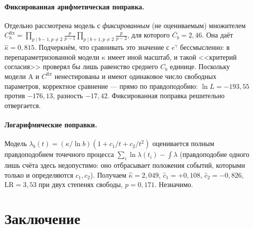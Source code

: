 \documentclass[11pt,a4paper]{article}
\theoremstyle{plain}
\theoremstyle{remark}
\newcommand{\eg}{e^{\gamma}}
\begin{document}
\paragraph{Фиксированная арифметическая поправка.} Отдельно рассмотрена модель с
\emph{фиксированным} (не оцениваемым) множителем
$C^{\mathrm{fix}}_b=\prod_{p\mid b-1,p\ne2}\frac{p}{p-1}\prod_{p\mid b+1,p\ne2}\frac{p}{p-2}$,
для которого $\overline{C_b}=2{,}46$. Она даёт $\hat\kappa=0{,}815$. Подчеркнём, что
сравнивать это значение с $\eg$ бессмысленно: в перепараметризованной модели $\kappa$
имеет иной масштаб, и такой <<критерий согласия>> проверял бы лишь равенство среднего
$C_b$ единице. Поскольку модели A и $C^{\mathrm{fix}}$ ненестированы и имеют одинаковое
число свободных параметров, корректное сравнение --- прямо по правдоподобию:
$\ln L=-193{,}55$ против $-176{,}13$, разность $-17{,}42$. Фиксированная поправка
решительно отвергается.

\paragraph{Логарифмические поправки.} Модель $\lambda_b(t)=(\kappa/\ln b)(1+c_1/t+c_2/t^2)$
оценивается полным правдоподобием точечного процесса
$\sum_i\ln\lambda(t_i)-\int\lambda$ (правдоподобие одного лишь счёта здесь
недопустимо: оно отбрасывает положения событий, которыми только и определяются
$c_1,c_2$). Получаем $\hat\kappa=2{,}049$, $\hat c_1=+0{,}108$, $\hat c_2=-0{,}826$,
$\mathrm{LR}=3{,}53$ при двух степенях свободы, $p=0{,}171$. Незначимо.

\section{Заключение}
\end{document}
